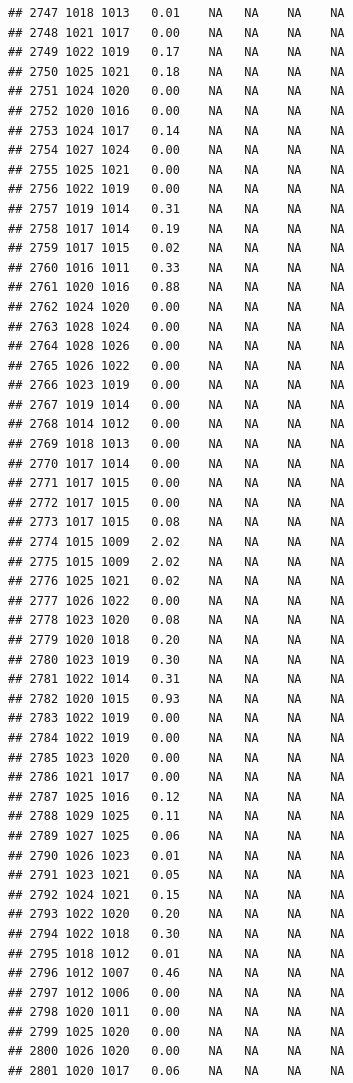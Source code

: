\documentclass{article}\usepackage{graphicx, color}
\makeatletter
\newenvironment{kframe}{%
 \def\at@end@of@kframe{}%
 \ifinner\ifhmode%
  \def\at@end@of@kframe{\end{minipage}}%
  \begin{minipage}{\columnwidth}%
 \fi\fi%
 \def\FrameCommand##1{\hskip\@totalleftmargin \hskip-\fboxsep
 \colorbox{shadecolor}{##1}\hskip-\fboxsep
     \hskip-\linewidth \hskip-\@totalleftmargin \hskip\columnwidth}%
 \MakeFramed {\advance\hsize-\width
   \@totalleftmargin\z@ \linewidth\hsize
   \@setminipage}}%
 {\par\unskip\endMakeFramed%
 \at@end@of@kframe}
\newenvironment{knitrout}{}{} %
\makeatother
\begin{document}
\begin{knitrout}
\begin{kframe}
\begin{verbatim}
## 2747 1018 1013   0.01    NA   NA    NA    NA
## 2748 1021 1017   0.00    NA   NA    NA    NA
## 2749 1022 1019   0.17    NA   NA    NA    NA
## 2750 1025 1021   0.18    NA   NA    NA    NA
## 2751 1024 1020   0.00    NA   NA    NA    NA
## 2752 1020 1016   0.00    NA   NA    NA    NA
## 2753 1024 1017   0.14    NA   NA    NA    NA
## 2754 1027 1024   0.00    NA   NA    NA    NA
## 2755 1025 1021   0.00    NA   NA    NA    NA
## 2756 1022 1019   0.00    NA   NA    NA    NA
## 2757 1019 1014   0.31    NA   NA    NA    NA
## 2758 1017 1014   0.19    NA   NA    NA    NA
## 2759 1017 1015   0.02    NA   NA    NA    NA
## 2760 1016 1011   0.33    NA   NA    NA    NA
## 2761 1020 1016   0.88    NA   NA    NA    NA
## 2762 1024 1020   0.00    NA   NA    NA    NA
## 2763 1028 1024   0.00    NA   NA    NA    NA
## 2764 1028 1026   0.00    NA   NA    NA    NA
## 2765 1026 1022   0.00    NA   NA    NA    NA
## 2766 1023 1019   0.00    NA   NA    NA    NA
## 2767 1019 1014   0.00    NA   NA    NA    NA
## 2768 1014 1012   0.00    NA   NA    NA    NA
## 2769 1018 1013   0.00    NA   NA    NA    NA
## 2770 1017 1014   0.00    NA   NA    NA    NA
## 2771 1017 1015   0.00    NA   NA    NA    NA
## 2772 1017 1015   0.00    NA   NA    NA    NA
## 2773 1017 1015   0.08    NA   NA    NA    NA
## 2774 1015 1009   2.02    NA   NA    NA    NA
## 2775 1015 1009   2.02    NA   NA    NA    NA
## 2776 1025 1021   0.02    NA   NA    NA    NA
## 2777 1026 1022   0.00    NA   NA    NA    NA
## 2778 1023 1020   0.08    NA   NA    NA    NA
## 2779 1020 1018   0.20    NA   NA    NA    NA
## 2780 1023 1019   0.30    NA   NA    NA    NA
## 2781 1022 1014   0.31    NA   NA    NA    NA
## 2782 1020 1015   0.93    NA   NA    NA    NA
## 2783 1022 1019   0.00    NA   NA    NA    NA
## 2784 1022 1019   0.00    NA   NA    NA    NA
## 2785 1023 1020   0.00    NA   NA    NA    NA
## 2786 1021 1017   0.00    NA   NA    NA    NA
## 2787 1025 1016   0.12    NA   NA    NA    NA
## 2788 1029 1025   0.11    NA   NA    NA    NA
## 2789 1027 1025   0.06    NA   NA    NA    NA
## 2790 1026 1023   0.01    NA   NA    NA    NA
## 2791 1023 1021   0.05    NA   NA    NA    NA
## 2792 1024 1021   0.15    NA   NA    NA    NA
## 2793 1022 1020   0.20    NA   NA    NA    NA
## 2794 1022 1018   0.30    NA   NA    NA    NA
## 2795 1018 1012   0.01    NA   NA    NA    NA
## 2796 1012 1007   0.46    NA   NA    NA    NA
## 2797 1012 1006   0.00    NA   NA    NA    NA
## 2798 1020 1011   0.00    NA   NA    NA    NA
## 2799 1025 1020   0.00    NA   NA    NA    NA
## 2800 1026 1020   0.00    NA   NA    NA    NA
## 2801 1020 1017   0.06    NA   NA    NA    NA

\end{verbatim}
\end{kframe}
\end{knitrout}
\end{document}
